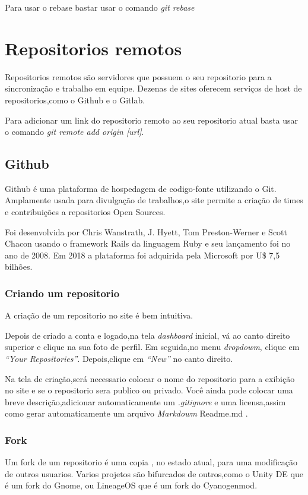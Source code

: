 \documentclass[]{article}
\begin{document}
Para usar o rebase bastar usar o comando \textit{git rebase}


\section{Repositorios remotos}

Repositorios remotos são servidores que possuem o seu repositorio para a sincronização e trabalho em equipe.
 Dezenas de sites oferecem serviços de host de repositorios,como o Github e o Gitlab.
 
 Para adicionar um link do repositorio remoto ao seu repositorio atual basta usar o comando \textit{git remote add origin [url]}.
 \subsection*{Github}
Github é uma plataforma de hospedagem de codigo-fonte utilizando o Git.
Amplamente usada para divulgação de trabalhos,o site permite a criação de times e contribuições a repositorios Open Sources.

Foi desenvolvida por Chris Wanstrath, J. Hyett, Tom Preston-Werner e Scott Chacon usando o framework Rails da linguagem Ruby e seu lançamento foi no ano de 2008.
Em 2018 a plataforma foi adquirida pela Microsoft por U\$ 7,5 bilhões.
\subsubsection*{Criando um repositorio}
A criação de um repositorio no site é bem intuitiva.

Depois de criado a conta e logado,na tela \textit{dashboard} inicial, vá ao canto direito superior e clique na sua foto de perfil.
Em seguida,no menu \textit{dropdowm}, clique em \textit{``Your Repositories''}.
Depois,clique em \textit{``New''} no canto direito.

Na tela de criação,será necessario colocar o nome do repositorio para a exibição no site e se o repositorio sera publico ou privado.
Você ainda pode colocar uma breve descrição,adicionar automaticamente um \textit{.gitignore} e uma licensa,assim como gerar automaticamente um arquivo \textit{Markdowm} Readme.md .

\subsubsection*{Fork}

Um fork de um repositorio é uma copia , no estado atual, para uma modificação de outros usuarios.
Varios projetos são bifurcados de outros,como o Unity DE que é um fork do Gnome, ou LineageOS que é um fork do Cyanogenmod.
\end{document}
